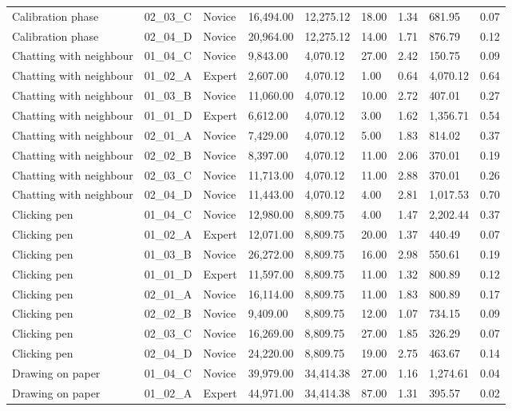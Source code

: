 \documentclass[
  english,
  man,floatsintext]{apa6}
\begin{document}
\begin{table}[h]
\begin{center}
\begin{threeparttable}
{\begin{tabular}{lllllllll}
Calibration phase & 02\_03\_C & Novice & 16,494.00 & 12,275.12 & 18.00 & 1.34 & 681.95 & 0.07\\
Calibration phase & 02\_04\_D & Novice & 20,964.00 & 12,275.12 & 14.00 & 1.71 & 876.79 & 0.12\\
Chatting with neighbour & 01\_04\_C & Novice & 9,843.00 & 4,070.12 & 27.00 & 2.42 & 150.75 & 0.09\\
Chatting with neighbour & 01\_02\_A & Expert & 2,607.00 & 4,070.12 & 1.00 & 0.64 & 4,070.12 & 0.64\\
Chatting with neighbour & 01\_03\_B & Novice & 11,060.00 & 4,070.12 & 10.00 & 2.72 & 407.01 & 0.27\\
Chatting with neighbour & 01\_01\_D & Expert & 6,612.00 & 4,070.12 & 3.00 & 1.62 & 1,356.71 & 0.54\\
Chatting with neighbour & 02\_01\_A & Novice & 7,429.00 & 4,070.12 & 5.00 & 1.83 & 814.02 & 0.37\\
Chatting with neighbour & 02\_02\_B & Novice & 8,397.00 & 4,070.12 & 11.00 & 2.06 & 370.01 & 0.19\\
Chatting with neighbour & 02\_03\_C & Novice & 11,713.00 & 4,070.12 & 11.00 & 2.88 & 370.01 & 0.26\\
Chatting with neighbour & 02\_04\_D & Novice & 11,443.00 & 4,070.12 & 4.00 & 2.81 & 1,017.53 & 0.70\\
Clicking pen & 01\_04\_C & Novice & 12,980.00 & 8,809.75 & 4.00 & 1.47 & 2,202.44 & 0.37\\
Clicking pen & 01\_02\_A & Expert & 12,071.00 & 8,809.75 & 20.00 & 1.37 & 440.49 & 0.07\\
Clicking pen & 01\_03\_B & Novice & 26,272.00 & 8,809.75 & 16.00 & 2.98 & 550.61 & 0.19\\
Clicking pen & 01\_01\_D & Expert & 11,597.00 & 8,809.75 & 11.00 & 1.32 & 800.89 & 0.12\\
Clicking pen & 02\_01\_A & Novice & 16,114.00 & 8,809.75 & 11.00 & 1.83 & 800.89 & 0.17\\
Clicking pen & 02\_02\_B & Novice & 9,409.00 & 8,809.75 & 12.00 & 1.07 & 734.15 & 0.09\\
Clicking pen & 02\_03\_C & Novice & 16,269.00 & 8,809.75 & 27.00 & 1.85 & 326.29 & 0.07\\
Clicking pen & 02\_04\_D & Novice & 24,220.00 & 8,809.75 & 19.00 & 2.75 & 463.67 & 0.14\\
Drawing on paper & 01\_04\_C & Novice & 39,979.00 & 34,414.38 & 27.00 & 1.16 & 1,274.61 & 0.04\\
Drawing on paper & 01\_02\_A & Expert & 44,971.00 & 34,414.38 & 87.00 & 1.31 & 395.57 & 0.02\\

\end{tabular}}
\end{threeparttable}
\end{center}
\end{table}
\end{document}
